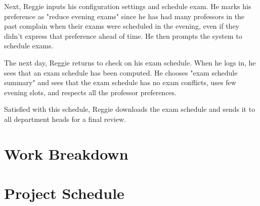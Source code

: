 \documentclass[11pt]{article}
\begin{document}
\begin{description}
Next, Reggie inputs his configuration settings and schedule exam.
He marks his preference as "reduce evening exams" since he has had many professors
in the past complain when their exams were scheduled in the evening,
even if they didn't express that preference ahead of time.
He then prompts the system to schedule exams.

The next day, Reggie returns to check on his exam schedule.
When he logs in, he sees that an exam schedule has been computed.
He chooses "exam schedule summary" and sees that
the exam schedule has no exam conflicts, uses few evening slots,
and respects all the professor preferences.

Satisfied with this schedule, Reggie downloads the exam schedule
 and sends it to all department heads for a final review.


\end{description}


\section{Work Breakdown}




\section{Project Schedule}
\end{document}
